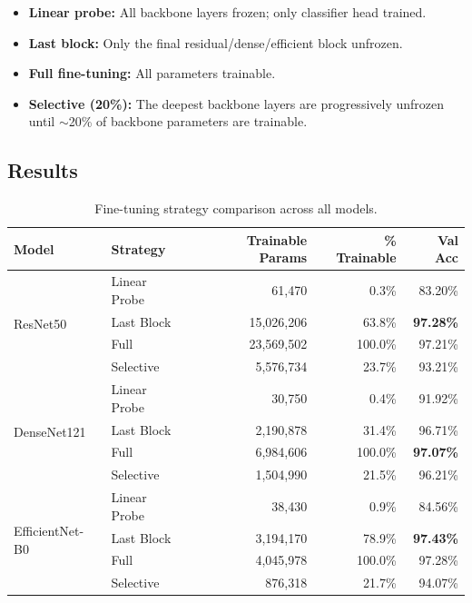 \documentclass[11pt, a4paper]{article}
\begin{document}
\begin{itemize}[nosep]
    \item \textbf{Linear probe:} All backbone layers frozen; only classifier head trained.
    \item \textbf{Last block:} Only the final residual/dense/efficient block unfrozen.
    \item \textbf{Full fine-tuning:} All parameters trainable.
    \item \textbf{Selective (20\%):} The deepest backbone layers are progressively unfrozen until $\sim$20\% of backbone parameters are trainable.
\end{itemize}

\subsection{Results}

\begin{table}[H]
\centering
\caption{Fine-tuning strategy comparison across all models.}
\label{tab:s2}
\begin{tabular}{llrrr}
\toprule
\textbf{Model} & \textbf{Strategy} & \textbf{Trainable Params} & \textbf{\% Trainable} & \textbf{Val Acc} \\
\midrule
\multirow{4}{*}{ResNet50} & Linear Probe & 61,470 & 0.3\% & 83.20\% \\
& Last Block & 15,026,206 & 63.8\% & \textbf{97.28\%} \\
& Full & 23,569,502 & 100.0\% & 97.21\% \\
& Selective & 5,576,734 & 23.7\% & 93.21\% \\
\midrule
\multirow{4}{*}{DenseNet121} & Linear Probe & 30,750 & 0.4\% & 91.92\% \\
& Last Block & 2,190,878 & 31.4\% & 96.71\% \\
& Full & 6,984,606 & 100.0\% & \textbf{97.07\%} \\
& Selective & 1,504,990 & 21.5\% & 96.21\% \\
\midrule
\multirow{4}{*}{EfficientNet-B0} & Linear Probe & 38,430 & 0.9\% & 84.56\% \\
& Last Block & 3,194,170 & 78.9\% & \textbf{97.43\%} \\
& Full & 4,045,978 & 100.0\% & 97.28\% \\
& Selective & 876,318 & 21.7\% & 94.07\% \\
\bottomrule
\end{tabular}
\end{table}
\end{document}
